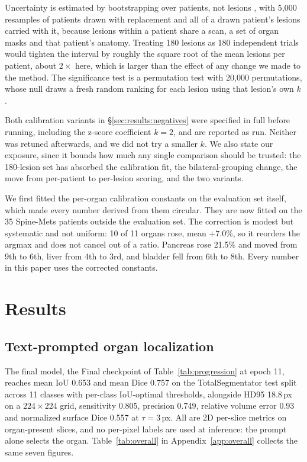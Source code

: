 \documentclass[10pt]{article}
\begin{document}
Uncertainty is estimated by bootstrapping over patients, not lesions
\cite{efron1994bootstrap}, with 5{,}000 resamples of patients drawn with
replacement and all of a drawn patient's lesions carried with it, because lesions
within a patient share a scan, a set of organ masks and that patient's anatomy.
Treating 180 lesions as 180 independent trials would tighten the interval by
roughly the square root of the mean lesions per patient, about $2\times$ here,
which is larger than the effect of any change we made to the method. The
significance test is a permutation test with 20{,}000 permutations, whose null
draws a fresh random ranking for each lesion using that lesion's own $k$.

Both calibration variants in \S\ref{sec:results:negatives} were specified in full
before running, including the z-score coefficient $k=2$, and are reported as run.
Neither was retuned afterwards, and we did not try a smaller $k$. We also state
our exposure, since it bounds how much any single comparison should be trusted:
the 180-lesion set has absorbed the calibration fit, the bilateral-grouping
change, the move from per-patient to per-lesion scoring, and the two variants.

We first fitted the per-organ calibration
constants on the evaluation set itself, which made every number derived from them
circular. They are now fitted on the 35 Spine-Mets patients outside the evaluation
set. The correction is modest but systematic and not uniform: 10 of 11 organs
rose, mean $+7.0\%$, so it reorders the argmax and does not cancel out of a ratio.
Pancreas rose 21.5\% and moved from 9th to 6th, liver from 4th to 3rd, and bladder
fell from 6th to 8th. Every number in this paper uses the corrected constants.

\section{Results}
\label{sec:results}

\subsection{Text-prompted organ localization}
\label{sec:results:phase1}

The final model, the Final checkpoint of Table~\ref{tab:progression} at epoch 11, reaches mean IoU 0.653 and mean Dice
0.757 on the TotalSegmentator test split across 11 classes with per-class
IoU-optimal thresholds, alongside HD95 18.8\,px on a $224\times224$ grid,
sensitivity 0.805, precision 0.749, relative volume error 0.93 and normalized
surface Dice 0.557 at $\tau=3$\,px. All are 2D per-slice metrics on
organ-present slices, and no per-pixel labels are used at inference: the prompt
alone selects the organ. Table~\ref{tab:overall} in Appendix~\ref{app:overall}
collects the same seven figures.
\end{document}
